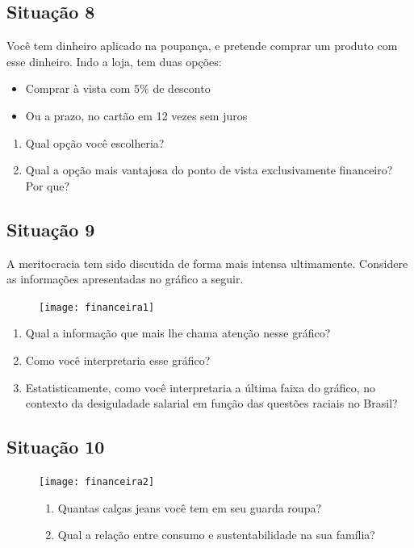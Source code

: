 \subsection{Situação 8}
Você tem dinheiro aplicado na poupança, e pretende comprar um produto com esse dinheiro. Indo a loja, tem duas opções:
\begin{itemize}
\item Comprar à vista com $5\%$ de desconto
\item Ou a prazo, no cartão em 12 vezes sem juros
\end{itemize}

\begin{enumerate}
\item Qual opção você escolheria?
\item Qual a opção mais vantajosa do ponto de vista exclusivamente financeiro? Por que?
\end{enumerate}

\subsection{Situação 9}
A meritocracia tem sido discutida de forma mais intensa ultimamente. Considere as informações apresentadas no gráfico a seguir.

\begin{figure}[H]
\centering

\texttt{[image: financeira1]}
\end{figure}

\begin{enumerate}
  \item Qual a informação que mais lhe chama atenção nesse gráfico?
  \item Como você interpretaria esse gráfico?
  \item Estatisticamente, como você interpretaria a última faixa do gráfico, no contexto da desiguladade salarial em função das questões raciais no Brasil?
\end{enumerate}

\subsection{Situação 10}
\begin{figure}[H]
\centering

\texttt{[image: financeira2]}
\begin{enumerate}
  \item Quantas calças jeans você tem em seu guarda roupa?
  \item Qual a relação entre consumo e sustentabilidade na sua família?
\end{enumerate}
\end{figure}

